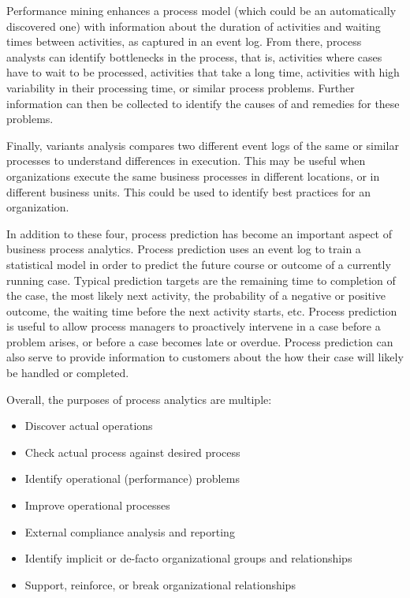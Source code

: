 Performance mining enhances a process model (which could be an automatically discovered one) with information about the duration of activities and waiting times between activities, as captured in an event log. From there, process analysts can identify bottlenecks in the process, that is, activities where cases have to wait to be processed, activities that take a long time, activities with high variability in their processing time, or similar process problems. Further information can then be collected to identify the causes of and remedies for these problems.

Finally, variants analysis compares two different event logs of the same or similar processes to understand differences in execution. This may be useful when organizations execute the same business processes in different locations, or in different business units. This could be used to identify best practices for an organization.

In addition to these four, process prediction has become an important aspect of business process analytics. Process prediction uses an event log to train a statistical model in order to predict the future course or outcome of a currently running case. Typical prediction targets are the remaining time to completion of the case, the most likely next activity, the probability of a negative or positive outcome, the waiting time before the next activity starts, etc. Process prediction is useful to allow process managers to proactively intervene in a case before a problem arises, or before a case becomes late or overdue. Process prediction can also serve to provide information to customers about the how their case will likely be handled or completed.

Overall, the purposes of process analytics are multiple:
\begin{itemize}
   \item Discover actual operations
   \item Check actual process against desired process
   \item Identify operational (performance) problems
   \item Improve operational processes
   \item External compliance analysis and reporting
   \item Identify implicit or de-facto organizational groups and relationships 
   \item Support, reinforce, or break organizational relationships
\end{itemize}

